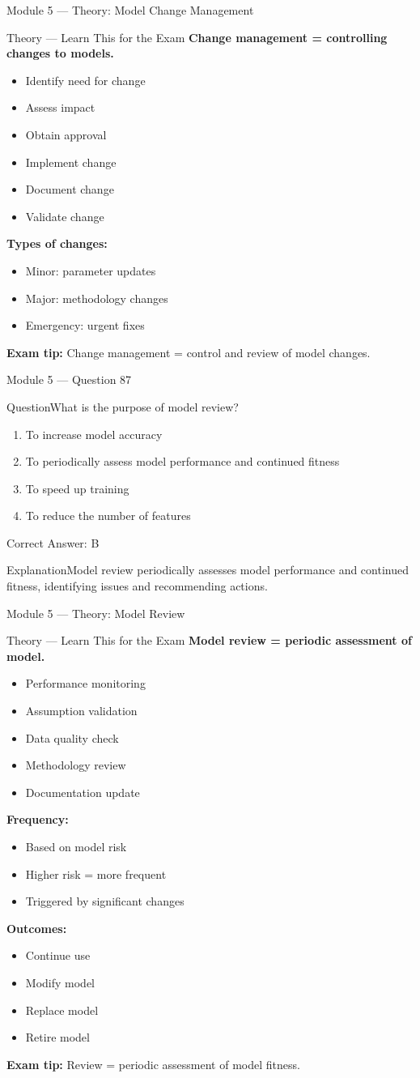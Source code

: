 \documentclass[aspectratio=169,10pt]{beamer}
\newcommand{\question}[1]{\begin{block}{Question}#1\end{block}}
\newcommand{\options}[4]{%
	\begin{enumerate}[label=\Alph*.,leftmargin=*]
		\item #1
		\item #2
		\item #3
		\item #4
	\end{enumerate}
}
\newcommand{\answerbox}[1]{\begin{exampleblock}{Correct Answer: #1}\end{exampleblock}}
\newcommand{\explain}[1]{\begin{block}{Explanation}#1\end{block}}
\newcommand{\theory}[1]{%
	\begin{block}{Theory --- Learn This for the Exam}
		\small #1
	\end{block}
}
\begin{document}
	\begin{frame}{Module 5 --- Theory: Model Change Management}
		\theory{
			\textbf{Change management = controlling changes to models.}
			\begin{itemize}
				\item Identify need for change
				\item Assess impact
				\item Obtain approval
				\item Implement change
				\item Document change
				\item Validate change
			\end{itemize}
			\textbf{Types of changes:}
			\begin{itemize}
				\item Minor: parameter updates
				\item Major: methodology changes
				\item Emergency: urgent fixes
			\end{itemize}
			\textbf{Exam tip:} Change management = control and review of model changes.
		}
	\end{frame}
	
	\begin{frame}{Module 5 --- Question 87}
		\question{What is the purpose of model review?}
		\options{To increase model accuracy}{To periodically assess model performance and continued fitness}{To speed up training}{To reduce the number of features}
		\answerbox{B}
		\explain{Model review periodically assesses model performance and continued fitness, identifying issues and recommending actions.}
	\end{frame}
	
	\begin{frame}{Module 5 --- Theory: Model Review}
		\theory{
			\textbf{Model review = periodic assessment of model.}
			\begin{itemize}
				\item Performance monitoring
				\item Assumption validation
				\item Data quality check
				\item Methodology review
				\item Documentation update
			\end{itemize}
			\textbf{Frequency:}
			\begin{itemize}
				\item Based on model risk
				\item Higher risk = more frequent
				\item Triggered by significant changes
			\end{itemize}
			\textbf{Outcomes:}
			\begin{itemize}
				\item Continue use
				\item Modify model
				\item Replace model
				\item Retire model
			\end{itemize}
			\textbf{Exam tip:} Review = periodic assessment of model fitness.
		}
	\end{frame}
	
\end{document}
